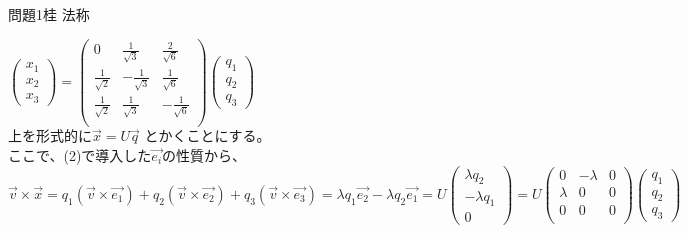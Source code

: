 \documentclass[fleqn]{jbook}
\begin{document}
\begin{answer}{問題1}{桂  法称}
\begin{enumerate}
$\left(
     \begin{array}{c}
       x_1\\
       x_2\\
       x_3
     \end{array}\right) =
\left(
      \begin{array}{ccc}
        0 & \frac{1}{\sqrt 3}& \frac{2}{\sqrt 6}\\
        \frac{1}{\sqrt 2}& -\frac{1}{\sqrt 3}& \frac{1}{\sqrt 6}\\
        \frac{1}{\sqrt 2} & \frac{1}{\sqrt 3}& -\frac{1}{\sqrt 6}\\
      \end{array} \right)
\left(
     \begin{array}{c}
       q_1\\
       q_2\\
       q_3
     \end{array}\right)$\\
上を形式的に$\overrightarrow{x}=U\overrightarrow{q}$
とかくことにする。\\

ここで、(2)で導入した$\overrightarrow{e_i}$の性質から、\\
$\overrightarrow{v} \times \overrightarrow{x} = 
q_1(\overrightarrow{v} \times \overrightarrow{e_1})
+q_2(\overrightarrow{v} \times \overrightarrow{e_2})
+q_3(\overrightarrow{v} \times \overrightarrow{e_3}) =
\lambda q_1 \overrightarrow{e_2} 
-\lambda q_2 \overrightarrow{e_1} = U  \left(
     \begin{array}{c}
       \lambda q_2\\
      -\lambda q_1\\
       0
     \end{array}\right) = U \left(
      \begin{array}{ccc}
        0 & -\lambda & 0 \\
        \lambda  & 0 & 0 \\
        0 & 0 & 0        \\
      \end{array} \right)  \left(
     \begin{array}{c}
       q_1\\
       q_2\\
       q_3
     \end{array}\right)$\\


\end{enumerate}
\end{answer}
\end{document}

